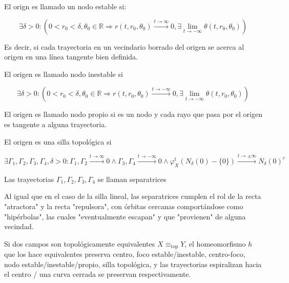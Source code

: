 \begin{defn}
	El orign es llamado un nodo estable si:
	
	\begin{equation*}
		\exists \delta>0: (0 < r_0 < \delta , \theta_0 \in \mathbb{R} \Rightarrow r(t,r_0,\theta_0) \overset{t\to \infty}{\to} 0 , \exists \lim_{t\to -\infty}\theta(t,r_0,\theta_0) )
	\end{equation*}
	
	Es decir, si cada trayectoria en un vecindario borrado del origen se acerca al origen en una línea tangente bien definida.
	
	El origen es llamado nodo inestable si
	
	\begin{equation*}
		\exists \delta>0: (0 < r_0 < \delta , \theta_0 \in \mathbb{R} \Rightarrow r(t,r_0,\theta_0) \overset{t\to -\infty}{\to} 0 , \exists \lim_{t\to -\infty}\theta(t,r_0,\theta_0) )
	\end{equation*}
	
	El origen es llamado nodo propio si es un nodo y cada rayo que pasa por el origen es tangente a alguna trayectoria.
\end{defn}

\begin{defn}
	El origen es una silla topológica si
	
	\begin{equation*}
		\exists \Gamma_1, \Gamma_2 ,\Gamma_3, \Gamma_4, \delta >0: \Gamma_1 ,\Gamma_2 \overset{t \to \infty}{\to}0\land \Gamma_3 ,\Gamma_4 \overset{t \to -\infty}{\to}0 \land   \varphi^t_X(N_\delta(0)-\{0\}) \overset{t\to \pm\infty}{\to} N_\delta(0)^c
	\end{equation*}
	
	Las trayectorias $\Gamma_1, \Gamma_2 ,\Gamma_3, \Gamma_4$ se llaman separatrices
\end{defn}

\begin{rmrk}
	Al igual que en el caso de la silla lineal, las separatrices cumplen el rol de la recta "atractora" y la recta "repulsora", con órbitas cercanas comportándose como "hipérbolas", las cuales "eventualmente escapan" y que "provienen" de alguna vecindad.
\end{rmrk}

\begin{thm}
	Si dos campos son topológicamente equivalentes $X\equiv_{\text{top}} Y$, el homeomorfismo $h$ que los hace equivalentes preserva centro, foco estable/inestable, centro-foco, nodo estable/inestable/propio, silla topológica, y las trayectorias espiralizan hacia el centro / una curva cerrada se preservan respectivamente.
\end{thm}

